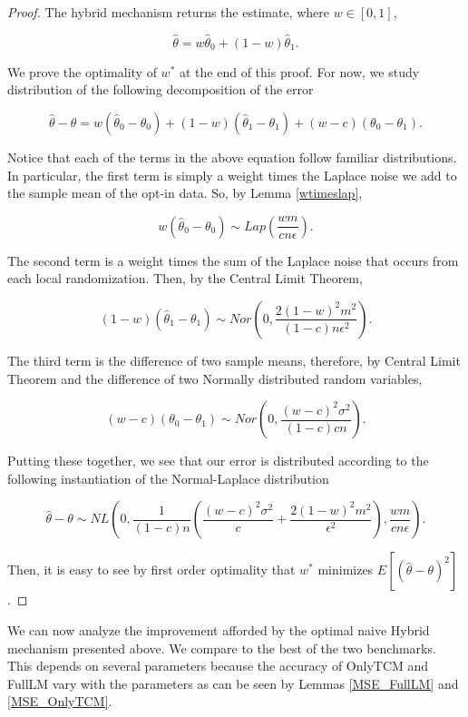 \documentclass{article}
\theoremstyle{plain}
\begin{document}
\begin{proof}
The hybrid mechanism returns the estimate, where $w \in [0,1]$,

$$\hat{\theta} = w\hat{\theta}_0 + (1-w)\hat{\theta}_1.$$

We prove the optimality of $w^*$ at the end of this proof. For now, we study distribution of the following decomposition of the error

$$\hat{\theta} - \theta = w(\hat{\theta}_0 - \theta_0) + (1-w)(\hat{\theta}_1 - \theta_1) + (w-c)(\theta_0 - \theta_1).$$

Notice that each of the terms in the above equation follow familiar distributions. In particular, the first term is simply a weight times the Laplace noise we add to the sample mean of the opt-in data. So, by Lemma \ref{wtimeslap},

$$w(\hat{\theta}_0 - \theta_0) \sim Lap\left(\frac{wm}{cn\epsilon}\right).$$

The second term is a weight times the sum of the Laplace noise that occurs from each local randomization. Then, by the Central Limit Theorem,

$$(1-w)(\hat{\theta}_1 - \theta_1) \sim Nor\left(0, \frac{2(1-w)^2 m^2}{(1-c)n\epsilon^2}\right).$$

The third term is the difference of two sample means, therefore, by Central Limit Theorem and the difference of two Normally distributed random variables, 

$$(w-c)(\theta_0 - \theta_1) \sim Nor\left(0, \frac{(w-c)^2\sigma^2}{(1-c)cn}\right).$$

Putting these together, we see that our error is distributed according to the following instantiation of the Normal-Laplace distribution

$$\hat{\theta} - \theta \sim NL\left(0, \frac{1}{(1-c)n}\left(\frac{(w-c)^2\sigma^2}{c} + \frac{2(1-w)^2 m^2}{\epsilon^2}\right), \frac{wm}{cn\epsilon}\right).$$

Then, it is easy to see by first order optimality that $w^*$ minimizes $E[(\hat{\theta} - \theta)^2]$.
\end{proof}

We can now analyze the improvement afforded by the optimal naive Hybrid mechanism presented above. We compare to the best of the two benchmarks. This depends on several parameters because the accuracy of OnlyTCM and FullLM vary with the parameters as can be seen by Lemmas \ref{MSE_FullLM} and \ref{MSE_OnlyTCM}. 
\end{document}
